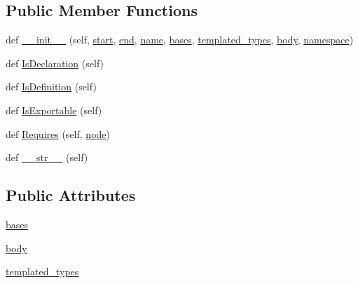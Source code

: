 \subsection*{Public Member Functions}
\begin{DoxyCompactItemize}
\item 
def \hyperlink{classcpp_1_1ast_1_1Class_acc17c34512d5cc54d5125734ce79f219}{\+\_\+\+\_\+init\+\_\+\+\_\+} (self, \hyperlink{classcpp_1_1ast_1_1Node_a7b2aa97e6a049bb1a93aea48c48f1f44}{start}, \hyperlink{classcpp_1_1ast_1_1Node_a3c5e5246ccf619df28eca02e29d69647}{end}, \hyperlink{classcpp_1_1ast_1_1__GenericDeclaration_af774f4729dfd78d0538a6782fe8514c1}{name}, \hyperlink{classcpp_1_1ast_1_1Class_a5665eb67314a075d4e0ff91accbde5d1}{bases}, \hyperlink{classcpp_1_1ast_1_1Class_a48ed0d3115656554d9134bc1787390fa}{templated\+\_\+types}, \hyperlink{classcpp_1_1ast_1_1Class_add39f61fdcf6dae42d79cac3dcbb7782}{body}, \hyperlink{classcpp_1_1ast_1_1__GenericDeclaration_a8aee3f11b37449d54b42a78e0a689f46}{namespace})
\item 
def \hyperlink{classcpp_1_1ast_1_1Class_a4758bfb7c00410575932974e1ed8b7da}{Is\+Declaration} (self)
\item 
def \hyperlink{classcpp_1_1ast_1_1Class_ae6d2356f835d06d5109d9e4609d86780}{Is\+Definition} (self)
\item 
def \hyperlink{classcpp_1_1ast_1_1Class_a1ab749f8cfddb0903c6484791f70f42e}{Is\+Exportable} (self)
\item 
def \hyperlink{classcpp_1_1ast_1_1Class_a347673e0a2a7b840b7d2d1cae13977f7}{Requires} (self, \hyperlink{classnode}{node})
\item 
def \hyperlink{classcpp_1_1ast_1_1Class_a0a63f6fab75d61ffac6fb9f1c29ae84d}{\+\_\+\+\_\+str\+\_\+\+\_\+} (self)
\end{DoxyCompactItemize}
\subsection*{Public Attributes}
\begin{DoxyCompactItemize}
\item 
\hyperlink{classcpp_1_1ast_1_1Class_a5665eb67314a075d4e0ff91accbde5d1}{bases}
\item 
\hyperlink{classcpp_1_1ast_1_1Class_add39f61fdcf6dae42d79cac3dcbb7782}{body}
\item 
\hyperlink{classcpp_1_1ast_1_1Class_a48ed0d3115656554d9134bc1787390fa}{templated\+\_\+types}
\end{DoxyCompactItemize}


